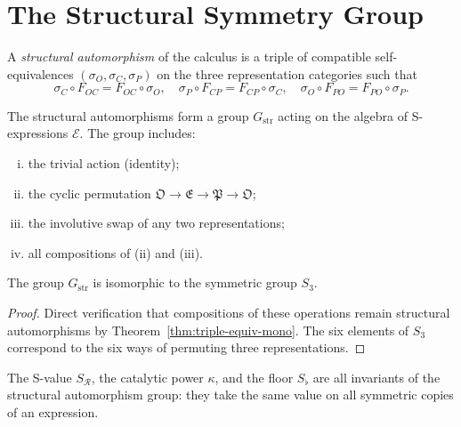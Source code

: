 \section{The Structural Symmetry Group}
\label{sec:ch15-symmetry}

\begin{definition}\label{def:struct-auto-mono}
A \emph{structural automorphism} of the calculus is a triple of compatible
self-equivalences $(\sigma_O, \sigma_C, \sigma_P)$ on the three representation
categories such that
\[
  \sigma_C \circ F_{OC} = F_{OC} \circ \sigma_O, \quad
  \sigma_P \circ F_{CP} = F_{CP} \circ \sigma_C, \quad
  \sigma_O \circ F_{PO} = F_{PO} \circ \sigma_P.
\]
\end{definition}

\begin{theorem}\label{thm:sym-group-mono}
The structural automorphisms form a group $G_{\mathrm{str}}$ acting on the
algebra of S-expressions $\mathcal{E}$.  The group includes:
\begin{enumerate}[(i)]
  \item the trivial action (identity);
  \item the cyclic permutation $\mathfrak{O} \to \mathfrak{E} \to
    \mathfrak{P} \to \mathfrak{O}$;
  \item the involutive swap of any two representations;
  \item all compositions of (ii) and (iii).
\end{enumerate}
The group $G_{\mathrm{str}}$ is isomorphic to the symmetric group $S_3$.
\end{theorem}

\begin{proof}
Direct verification that compositions of these operations remain structural
automorphisms by Theorem~\ref{thm:triple-equiv-mono}.  The six elements of
$S_3$ correspond to the six ways of permuting three representations.
\end{proof}

\begin{corollary}\label{cor:invariants-mono}
The S-value $S_{\mathcal{R}}$, the catalytic power $\kappa$, and the floor
$S_\flat$ are all invariants of the structural automorphism group: they take
the same value on all symmetric copies of an expression.
\end{corollary}

